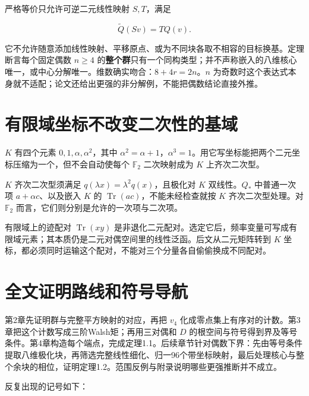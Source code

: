 \documentclass[UTF8,fontset=fandol,zihao=-4,openany,oneside]{ctexbook}
\begin{document}
严格等价只允许可逆二元线性映射 \(S,T\)，满足



\[
\widetilde Q(Sv)=TQ(v).\tag{英文(1.4)}
\]



它不允许随意添加线性映射、平移原点、或为不同块各取不相容的目标换基。定理断言每个固定偶数 \(n\ge4\) 的\textbf{整个群}只有一个同构类型；并不声称嵌入的八维核心唯一，或中心分解唯一。维数确实吻合：\(8+4r=2n\)。\(n\) 为奇数时这个表达式本身就不适配；论文还给出更强的非分解例，不能把偶数结论直接外推。



\section{有限域坐标不改变二次性的基域}


\(K\) 有四个元素 \(0,1,\alpha,\alpha^2\)，其中 \(\alpha^2=\alpha+1\)，\(\alpha^3=1\)。用它写坐标能把两个二元坐标压缩为一个，但不会自动使每个 \(\mathbb F_2\) 二次映射成为 \(K\) 上齐次二次型。



\(K\) 齐次二次型须满足 \(q(\lambda x)=\lambda^2q(x)\)，且极化对 \(K\) 双线性。\(Q_*\) 中普通一次项 \(a+\alpha c\)、以及嵌入 \(K\) 的 \(\operatorname{Tr}(ac)\)，不能未经检查就按 \(K\) 齐次二次型处理。对 \(\mathbb F_2\) 而言，它们则分别是允许的一次项与二次项。



有限域上的迹配对 \(\operatorname{Tr}(xy)\) 是非退化二元配对。选定它后，频率变量可写成有限域元素；其本质仍是二元对偶空间里的线性泛函。后文从二元矩阵转到 \(K\) 坐标，都必须同时运输这个配对，不能对三个分量各自偷偷换成不同配对。



\section{全文证明路线和符号导航}


第2章先证明群与完整平方映射的对应，再把 \(v_4\) 化成零点集上有序对的计数。第3章把这个计数写成三阶Walsh矩；再用三对偶和 \(D\) 的根空间与符号得到界及等号条件。第4章构造每个端点，完成定理1.1。后续章节针对偶数下界：先由等号条件提取八维极化块，再筛选完整线性细化、归一96个带坐标映射，最后处理核心与整个余块的相位，证明定理1.2。范围反例与附录说明哪些更强推断并不成立。



反复出现的记号如下：
\end{document}
